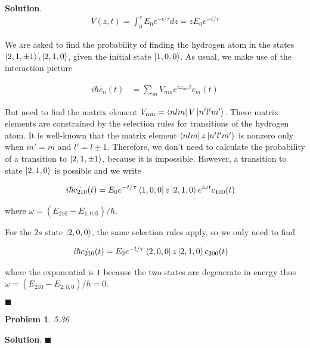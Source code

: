 \documentclass[12pt]{article}
\newtheorem{p}{Problem}
\theoremstyle{definition}
\newenvironment{s}{%
        \begin{trivlist} \item \textbf{Solution}. }{%
            \hspace*{\fill} $\blacksquare$\end{trivlist}}%
\begin{document}
{\begin{s}
\begin{align*}
V(z,t) = \int_{0}^{z} E_{0}e^{-t/\tau} dz = zE_{0}e^{-t/\tau}
\end{align*}

We are asked to find the probability of finding the hydrogen atom in the states $\ket{2,1,\pm 1}, \ket{2,1,0}$, given the initial state $\ket{1,0,0}$. As usual, we make use of the interaction picture

\begin{align*}
i\hbar\dot{c_{n}}(t) &= \sum_{m}V_{nm}e^{i\omega_{nm}t}c_{m}(t)
\end{align*}

But need to find the matrix element $V_{nm} = \bra{nlm}V\ket{n'l'm'}$. These matrix elements are constrained by the selection rules for transitions of the hydrogen atom. It is well-known that the matrix element $\bra{nlm}z\ket{n'l'm'}$ is nonzero only when $m'=m$ and $l' = l \pm 1$. Therefore, we don't need to calculate the probability of a transition to $\ket{2,1,\pm 1}$, because it is impossible. However, a transition to state $\ket{2,1,0}$ is possible and we write

\begin{align*}
i\hbar\dot{c_{210}}(t) &= E_{0}e^{-t/\tau}\bra{1,0,0}z\ket{2,1,0}e^{i\omega t}c_{100}(t)
\end{align*}

where $\omega = (E_{210}-E_{1,0,0})/\hbar$.

For the $2s$ state $\ket{2,0,0}$, the same selection rules apply, so we only need to find

\begin{align*}
i\hbar\dot{c_{210}}(t) &= E_{0}e^{-t/\tau}\bra{2,0,0}z\ket{2,1,0}c_{200}(t)
\end{align*}

where the exponential is $1$ because the two states are degenerate in energy thus $\omega = (E_{210}-E_{2,0,0})/\hbar = 0$.


\end{s}

\begin{p}
5.36
\end{p}

\begin{s}
\end{s}
\end{document}
